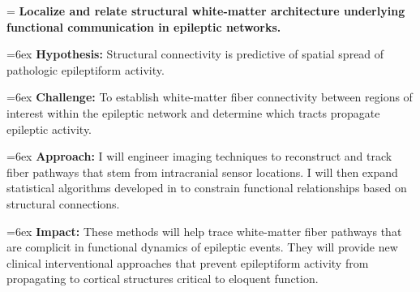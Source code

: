 \hangindent=\parindent
{}
\noindent
{} \textbf{Localize and relate structural white-matter architecture underlying functional communication in epileptic networks.}

\hangindent=6ex
\textbf{Hypothesis:} Structural connectivity is predictive of spatial spread of pathologic epileptiform activity.

\hangindent=6ex
\textbf{Challenge:} To establish white-matter fiber connectivity between regions of interest within the epileptic network and determine which tracts propagate epileptic activity.

\hangindent=6ex
\textbf{Approach:} I will engineer imaging techniques to reconstruct and track fiber pathways that stem from intracranial sensor locations. I will then expand statistical algorithms developed in  to constrain functional relationships based on structural connections.

\hangindent=6ex
\textbf{Impact:} These methods will help trace white-matter fiber pathways that are complicit in functional dynamics of epileptic events. They will provide new clinical interventional approaches that prevent epileptiform activity from propagating to cortical structures critical to eloquent function.
